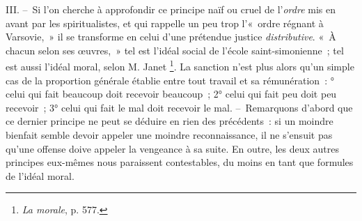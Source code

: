 \documentclass[french,twoside]{book} %
\begin{document}
III. – Si l’on cherche à approfondir ce principe naïf ou cruel de l’\emph{ordre} mis en avant par les spiritualistes, et qui rappelle un peu trop l’« ordre régnant à Varsovie, » il se transforme en celui d’une prétendue justice \emph{distributive}. « À chacun selon ses œuvres, » tel est l’idéal social de l’école saint-simonienne ; tel est aussi l’idéal moral, selon M. Janet \footnote{\emph{La morale}, p. 577.}. La sanction n’est plus alors qu’un simple cas de la proportion générale établie entre tout travail et sa rémunération : ° celui qui fait beaucoup doit recevoir beaucoup ; 2° celui qui fait peu doit peu recevoir ; 3° celui qui fait le mal doit recevoir le mal. – Remarquons d’abord que ce dernier principe ne peut se déduire en rien des précédents : si un moindre bienfait semble devoir appeler une moindre reconnaissance, il ne s’ensuit pas qu’une offense doive appeler la vengeance à sa suite. En outre, les deux autres principes eux-mêmes nous paraissent contestables, du moins en tant que formules de l’idéal moral.\par
\end{document}
